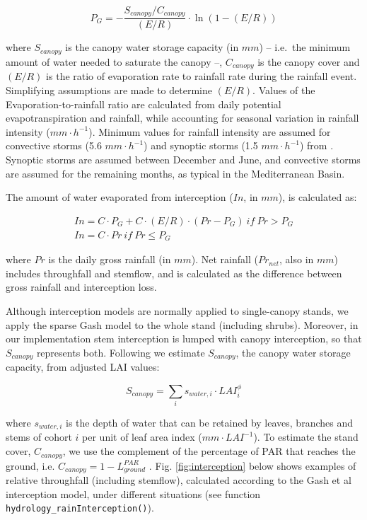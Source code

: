 \documentclass[]{book}
\begin{document}
\begin{equation}
P_G = - \frac{S_{canopy}/C_{canopy}}{(E/R)} \cdot \ln(1-(E/R))
\end{equation}

where \(S_{canopy}\) is the canopy water storage capacity (in \(mm\)) --
i.e.~the minimum amount of water needed to saturate the canopy --,
\(C_{canopy}\) is the canopy cover and \((E/R)\) is the ratio of
evaporation rate to rainfall rate during the rainfall event. Simplifying
assumptions are made to determine \((E/R)\). Values of the
Evaporation-to-rainfall ratio are calculated from daily potential
evapotranspiration and rainfall, while accounting for seasonal variation
in rainfall intensity (\(mm \cdot h^{-1}\)). Minimum values for rainfall
intensity are assumed for convective storms (5.6 \(mm \cdot h^{-1}\))
and synoptic storms (1.5 \(mm \cdot h^{-1}\)) from \citet{Miralles2010}.
Synoptic storms are assumed between December and June, and convective
storms are assumed for the remaining months, as typical in the
Mediterranean Basin.

The amount of water evaporated from interception (\(In\), in \(mm\)), is
calculated as:

\begin{eqnarray}
In = C\cdot P_G+C\cdot(E/R)\cdot(Pr-P_G) \: {if}\: Pr > P_G \\
In = C\cdot Pr\: {if}\: Pr \leq P_G
\end{eqnarray}

where \(Pr\) is the daily gross rainfall (in \(mm\)). Net rainfall
(\(Pr_{net}\), also in \(mm\)) includes throughfall and stemflow, and is
calculated as the difference between gross rainfall and interception
loss.

Although interception models are normally applied to single-canopy
stands, we apply the sparse Gash model to the whole stand (including
shrubs). Moreover, in our implementation stem interception is lumped
with canopy interception, so that \(S_{canopy}\) represents both.
Following \citet{Watanabe1996} we estimate \(S_{canopy}\), the canopy
water storage capacity, from adjusted LAI values:

\begin{equation}
S_{canopy}=\sum_{i}{s_{water,i}\cdot LAI_{i}^{\phi}}
\end{equation}

where \(s_{water,i}\) is the depth of water that can be retained by
leaves, branches and stems of cohort \(i\) per unit of leaf area index
(\(mm \cdot LAI^{-1}\)). To estimate the stand cover, \(C_{canopy}\), we
use the complement of the percentage of PAR that reaches the ground,
i.e. \(C_{canopy} = 1 - L^{PAR}_{ground}\) \citep{Deguchi2006}. Fig.
\ref{fig:interception} below shows examples of relative throughfall
(including stemflow), calculated according to the Gash et al
\citeyearpar{Gash1995} interception model, under different situations
(see function \texttt{hydrology\_rainInterception()}).
\end{document}
